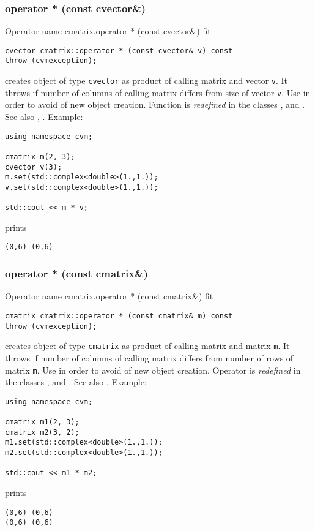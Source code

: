 \subsubsection{operator * (const cvector\&)}
Operator%
\pdfdest name {cmatrix.operator * (const cvector&)} fit
\begin{verbatim}
cvector cmatrix::operator * (const cvector& v) const
throw (cvmexception);
\end{verbatim}
creates  object of type \verb"cvector"
as  product of  calling matrix and  vector \verb"v".
It throws  
if number of columns of calling matrix
differs from size of  vector \verb"v".
Use 
in order to avoid of  new object creation.
Function is \emph{redefined} in the classes
,  
and .
See also
, .
Example:
\begin{Verbatim}
using namespace cvm;

cmatrix m(2, 3);
cvector v(3);
m.set(std::complex<double>(1.,1.));
v.set(std::complex<double>(1.,1.));

std::cout << m * v;
\end{Verbatim}
prints
\begin{Verbatim}
(0,6) (0,6)
\end{Verbatim}
\newpage



\subsubsection{operator * (const cmatrix\&)}
Operator%
\pdfdest name {cmatrix.operator * (const cmatrix&)} fit
\begin{verbatim}
cmatrix cmatrix::operator * (const cmatrix& m) const
throw (cvmexception);
\end{verbatim}
creates  object of type \verb"cmatrix"
as  product of  calling matrix and  matrix \verb"m".
It throws  
if number of columns of calling matrix
differs from number of rows of  matrix \verb"m".
Use  in order to avoid of
 new object creation.
Operator is \emph{redefined} in the classes
,  
and .
See also
.
Example:
\begin{Verbatim}
using namespace cvm;

cmatrix m1(2, 3);
cmatrix m2(3, 2);
m1.set(std::complex<double>(1.,1.));
m2.set(std::complex<double>(1.,1.));

std::cout << m1 * m2;
\end{Verbatim}
prints
\begin{Verbatim}
(0,6) (0,6)
(0,6) (0,6)
\end{Verbatim}
\newpage



